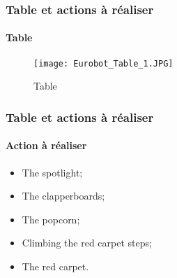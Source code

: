\begin{frame}
\frametitle{Table et actions à réaliser}
\framesubtitle{Table}
\begin{figure}[!ht]
	\centering
	\texttt{[image: Eurobot\_Table\_1.JPG]}
	\caption{Table}
\end{figure}
\end{frame}

\begin{frame}
\frametitle{Table et actions à réaliser}
\framesubtitle{Action à réaliser}
\begin{itemize}
	\item The spotlight;
	\item The clapperboards;
	\item The popcorn;
	\item Climbing the red carpet steps;
	\item The red carpet.
\end{itemize}
\end{frame}